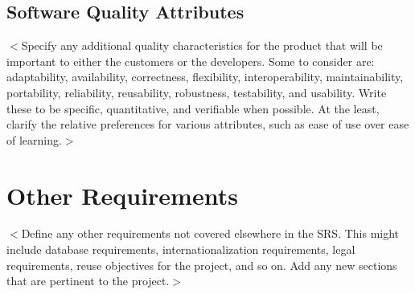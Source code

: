 \documentclass{scrreprt}
\begin{document}
\section{Software Quality Attributes}
$<$Specify any additional quality characteristics for the product that will be
important to either the customers or the developers. Some to consider are:
adaptability, availability, correctness, flexibility, interoperability,
maintainability, portability, reliability, reusability, robustness, testability,
and usability. Write these to be specific, quantitative, and verifiable when
possible. At the least, clarify the relative preferences for various attributes,
such as ease of use over ease of learning.$>$

\chapter{Other Requirements}
$<$Define any other requirements not covered elsewhere in the SRS. This might
include database requirements, internationalization requirements, legal
requirements, reuse objectives for the project, and so on. Add any new sections
that are pertinent to the project.$>$
\end{document}
